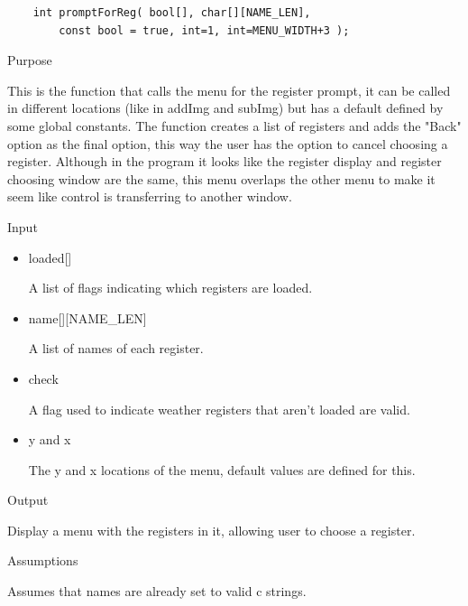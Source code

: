 \documentclass[pdftex, 11pt]{article}
\begin{document}
\begin{description}
\begin{lstlisting}
	int promptForReg( bool[], char[][NAME_LEN], 
		const bool = true, int=1, int=MENU_WIDTH+3 );
		\end{lstlisting}

		\begin{description}
			\item{Purpose}
				
				This is the function that calls the menu for the register prompt, it can be
				called in different locations (like in addImg and subImg) but has a default
				defined by some global constants.  The function creates a list of registers
				and adds the "Back" option as the final option, this way the user has the
				option to cancel choosing a register.  Although in the program it looks like
				the register display and register choosing window are the same, this menu
				overlaps the other menu to make it seem like control is transferring to another
				window.

			\item{Input}

				\begin{itemize}

					\item{loaded[]}

						A list of flags indicating which registers are loaded.

					\item{name[][NAME\_LEN]}

						A list of names of each register.

					\item{check}

						A flag used to indicate weather registers that aren't loaded are valid.

					\item{y and x}

						The y and x locations of the menu, default values are defined for this.

				\end{itemize}

			\item{Output}
				
				Display a menu with the registers in it, allowing user to
				choose a register.

			\item{Assumptions}

				Assumes that names are already set to valid c strings.

		\end{description}




\end{description}
\end{document}
